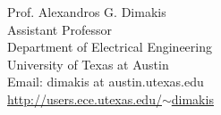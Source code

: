 \documentclass[margin,line]{resume}
\begin{document}
\begin{resume}
Prof. Alexandros G. Dimakis \\
Assistant Professor \\
Department of Electrical Engineering \\
University of Texas at Austin\\
Email: dimakis at austin.utexas.edu \\
\href{http://users.ece.utexas.edu/~dimakis}{http://users.ece.utexas.edu/$\sim$dimakis}

\end{resume}
\end{document}
